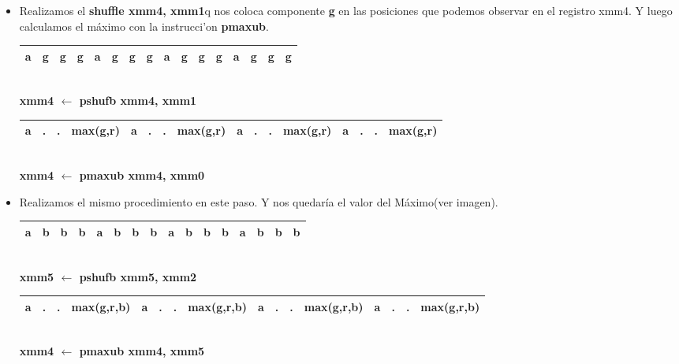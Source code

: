 \begin{itemize}
	\item Realizamos el \textbf{shuffle xmm4, xmm1}q nos coloca componente \textbf{g} en las posiciones que podemos observar en el registro xmm4. Y luego calculamos el máximo con la instrucci'on \textbf{pmaxub}. 


		\begin{center}
		   \begin{tabular}{| c | c | c | c || c | c | c | c || c | c | c | c || c | c | c | c |}
			 \hline
			 a & g & g & g & a & g & g & g & a & g & g & g & a & g & g & g \\ \hline
		   \end{tabular}
		   \\ \textbf{xmm4 $\gets$ pshufb xmm4, xmm1}
		\end{center}


		\begin{center}
		   \begin{tabular}{| c | c | c | c || c | c | c | c || c | c | c | c || c | c | c | c |}
			 \hline
			 a & . & . & max(g,r) & a & . & . & max(g,r) & a & . & . & max(g,r) & a & . & . & max(g,r)  \\ \hline
		   \end{tabular}
		   \\ \textbf{xmm4 $ \gets $ pmaxub xmm4, xmm0}
		\end{center}

	\item Realizamos el mismo procedimiento en este paso. Y nos quedaría el valor del Máximo(ver imagen). 
		\begin{center}
		   \begin{tabular}{| c | c | c | c || c | c | c | c || c | c | c | c || c | c | c | c |}
			 \hline
			 a & b & b & b & a & b & b & b & a & b & b & b & a & b & b & b \\ \hline
		   \end{tabular}
		   \\ \textbf{xmm5 $\gets$ pshufb xmm5, xmm2}
		\end{center}

		\begin{center}
		   \begin{tabular}{| c | c | c | c || c | c | c | c || c | c | c | c || c | c | c | c |}
			 \hline
			 a & . & . & max(g,r,b) & a & . & . & max(g,r,b) & a & . & . & max(g,r,b) & a & . & . & max(g,r,b)  \\ \hline
		   \end{tabular}
		   \\ \textbf{xmm4 $\gets$ pmaxub xmm4, xmm5}
		\end{center}



\end{itemize}
